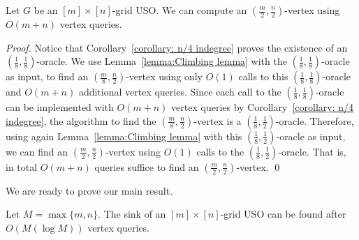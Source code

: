 \documentclass[runningheads,a4paper]{llncs}
\begin{document}
\begin{corollary}\label{corollary: (m/2,n/2) indegree}
Let $G$ be an $[m]\times [n]$-grid USO. 
We can compute an $( \frac{m}{2}, \frac{n}{2})$-vertex using $O(m + n)$ vertex queries.
\end{corollary}
\begin{proof}
Notice that Corollary~\ref{corollary: n/4 indegree} proves the existence of an $( \frac{1}{8}, \frac{1}{8})$-oracle.
We use Lemma~\ref{lemma:Climbing lemma} with the $(\frac{1}{8}, \frac{1}{8})$-oracle as input, to find an $(\frac{m}{8}, \frac{n}{2})$-vertex using only $O(1)$ calls to this $(\frac{1}{8}, \frac{1}{8})$-oracle and $O(m+n)$ additional vertex queries. Since each call to the  $(\frac{1}{8}, \frac{1}{8})$-oracle can be implemented with $O(m+n)$ vertex queries by Corollary~\ref{corollary: n/4 indegree}, the algorithm to find the $(\frac{m}{8}, \frac{n}{2})$-vertex is a $(\frac{1}{8}, \frac{1}{2})$-oracle. 
Therefore, using again Lemma~\ref{lemma:Climbing lemma} with this $(\frac{1}{8}, \frac{1}{2})$-oracle as input, we can find an $(\frac{m}{2}, \frac{n}{2})$-vertex using $O(1)$ calls to the $(\frac{1}{8}, \frac{1}{2})$-oracle. That is, in total $O(m + n)$ queries suffice to find an $(\frac{m}{2}, \frac{n}{2})$-vertex. \qed
\end{proof}

We are ready to prove our main result. 

\begin{theorem}\label{theorem:Sink algorithm}
 Let $M = \max\{m,n\}$. The sink of an $[m]\times[n]$-grid USO can be found after $O(M(\log M))$ vertex queries.
\end{theorem}
\end{document}
